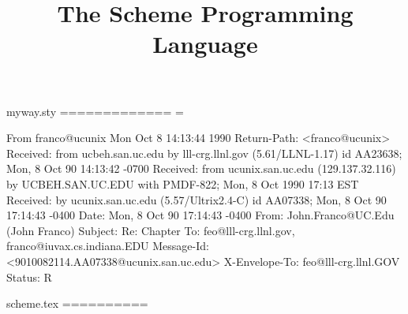myway.sty
=============
\evensidemargin=0cm     %
\oddsidemargin  0.5in
\topmargin=-2cm         %
\headsep=0.5cm
\textheight=8.5in       %
\textwidth=6in          %
\columnwidth=\textwidth
\marginparwidth 0pt
\marginparsep 0pt
\topmargin   0.5in

\def\verbatim{\small \@verbatim \frenchspacing\@vobeyspaces \@xverbatim}
\let\endverbatim=\endtrivlist


\def\section{\@startsection {section}{1}{\z@}{-3.5ex plus -1ex minus
    -.2ex}{2.3ex plus .2ex}{\large\bf}}

\def\subsection{\@startsection{subsection}{2}{\z@}{-3.25ex plus -1ex minus
 -.2ex}{1.5ex plus .2ex}{\normalsize\bf}}

From franco@ucunix Mon Oct  8 14:13:44 1990
Return-Path: <franco@ucunix>
Received: from ucbeh.san.uc.edu by lll-crg.llnl.gov (5.61/LLNL-1.17)
	id AA23638; Mon, 8 Oct 90 14:13:42 -0700
Received: from ucunix.san.uc.edu (129.137.32.116) by UCBEH.SAN.UC.EDU with
 PMDF-822; Mon, 8 Oct 1990 17:13 EST
Received: by ucunix.san.uc.edu (5.57/Ultrix2.4-C) id AA07338; Mon, 8 Oct 90
 17:14:43 -0400
Date: Mon, 8 Oct 90 17:14:43 -0400
From: John.Franco@UC.Edu (John Franco)
Subject: Re:  Chapter
To: feo@lll-crg.llnl.gov, franco@iuvax.cs.indiana.EDU
Message-Id: <9010082114.AA07338@ucunix.san.uc.edu>
X-Envelope-To: feo@lll-crg.llnl.GOV
Status: R

scheme.tex
==========



\title{The Scheme Programming Language}


